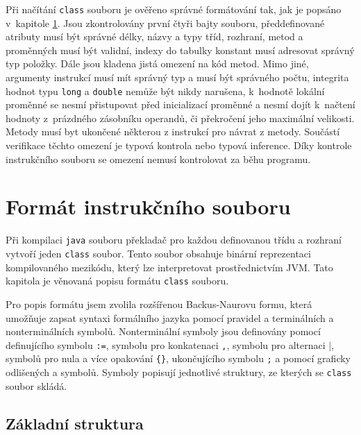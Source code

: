 Při načítání \texttt{class} souboru je ověřeno správné formátování tak, jak je popsáno v~kapitole \ref{Format}. Jsou zkontrolovány první čtyři bajty souboru, předdefinované atributy musí být správné délky, názvy a typy tříd, rozhraní, metod a proměnných musí být validní, indexy do tabulky konstant musí adresovat správný typ položky. Dále jsou kladena jistá omezení na kód metod. Mimo jiné, argumenty instrukcí musí mít správný typ a musí být správného počtu, integrita hodnot typu \texttt{long} a \texttt{double} nemůže být nikdy narušena, k~hodnotě lokální proměnné se nesmí přistupovat před inicializací proměnné a nesmí dojít k~načtení hodnoty z~prázdného zásobníku operandů, či překročení jeho maximální velikosti. Metody musí byt ukončené některou z instrukcí pro návrat z metody. Součástí verifikace těchto omezení je typová kontrola nebo typová inference. Díky kontrole instrukčního souboru se omezení nemusí kontrolovat za běhu programu.


\section{Formát instrukčního souboru}\label{Format}


Při kompilaci \texttt{java} souboru překladač pro každou definovanou třídu a rozhraní vytvoří jeden \texttt{class} soubor. Tento soubor obsahuje binární reprezentaci kompilovaného mezikódu, který lze interpretovat prostřednictvím JVM.  Tato kapitola je věnovaná popisu formátu \texttt{class} souboru.

Pro popis formátu jsem zvolila rozšířenou Backus-Naurovu formu, která umožňuje zapsat syntaxi formálního jazyka pomocí pravidel a terminálních a nonterminálních symbolů. Nonterminální symboly jsou definovány pomocí definujícího symbolu \texttt{:=}, symbolu pro konkatenaci \texttt{,}, symbolu pro alternaci \texttt{$\mathtt{|}$}, symbolů pro nula a více opakování \texttt{\{\}}, ukončujícího symbolu \texttt{;} a pomocí graficky odlišených  a  symbolů. Symboly popisují jednotlivé struktury, ze kterých se \texttt{class} soubor skládá.

\subsection{Základní struktura}\label{FormatBasic}

